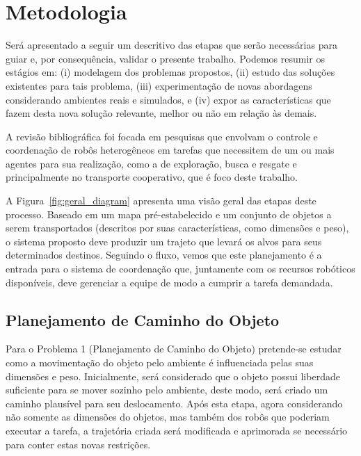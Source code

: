 \chapter{Metodologia} %
\label{cha:metodologia}

Será apresentado a seguir um descritivo das etapas que serão necessárias para guiar e, por consequência, validar o presente trabalho.
Podemos resumir os estágios em: (i) modelagem dos problemas propostos, (ii) estudo das soluções existentes para tais problema, (iii) experimentação de novas abordagens considerando ambientes reais e simulados, e (iv) expor as características que fazem desta nova solução relevante, melhor ou não em relação às demais.

A revisão bibliográfica foi focada em pesquisas que envolvam o controle e coordenação de robôs heterogêneos em tarefas que necessitem de um ou mais agentes para sua realização, como a de exploração, busca e resgate e principalmente no transporte cooperativo, que é foco deste trabalho.

A Figura~\ref{fig:geral_diagram} apresenta uma visão geral das etapas deste processo. Baseado em um mapa pré-estabelecido e um conjunto de objetos a serem transportados (descritos por suas características, como dimensões e peso), o sistema proposto deve produzir um trajeto que levará os alvos para seus determinados destinos. Seguindo o fluxo, vemos que este planejamento é a entrada para o sistema de coordenação que, juntamente com os recursos robóticos disponíveis, deve gerenciar a equipe de modo a cumprir a tarefa demandada.


\section{Planejamento de Caminho do Objeto} %
\label{sub:planejamento_de_caminho_do_objeto}

Para o Problema 1 (Planejamento de Caminho do Objeto) pretende-se estudar como a movimentação do objeto pelo ambiente é influenciada pelas suas dimensões e peso. Inicialmente, será considerado que o objeto possui liberdade suficiente para se mover sozinho pelo ambiente, deste modo, será criado um caminho plausível para seu deslocamento. Após esta etapa, agora considerando não somente as dimensões do objetos, mas também dos robôs que poderiam executar a tarefa, a trajetória criada será modificada e aprimorada se necessário para conter estas novas restrições.

